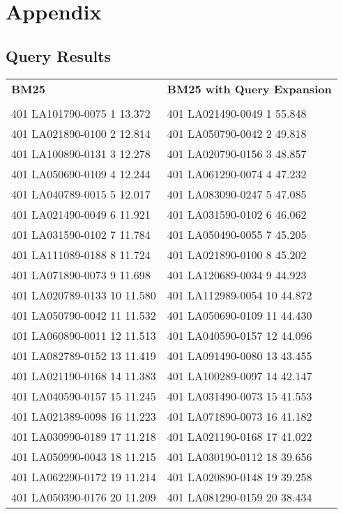 
\appendix
\section{Appendix}
\setlength{\tabcolsep}{15pt}

\subsection{Query Results}
\label{query_results}

\begin{tabular}{ l l }
\textbf{BM25} & \textbf{BM25 with Query Expansion}\\
\\
401 LA101790-0075 1 13.372 & 401 LA021490-0049 1 55.848\\
401 LA021890-0100 2 12.814 & 401 LA050790-0042 2 49.818\\
401 LA100890-0131 3 12.278 & 401 LA020790-0156 3 48.857\\
401 LA050690-0109 4 12.244 & 401 LA061290-0074 4 47.232\\
401 LA040789-0015 5 12.017 & 401 LA083090-0247 5 47.085\\
401 LA021490-0049 6 11.921 & 401 LA031590-0102 6 46.062\\
401 LA031590-0102 7 11.784 & 401 LA050490-0055 7 45.205\\
401 LA111089-0188 8 11.724 & 401 LA021890-0100 8 45.202\\
401 LA071890-0073 9 11.698 & 401 LA120689-0034 9 44.923\\
401 LA020789-0133 10 11.580 & 401 LA112989-0054 10 44.872\\
401 LA050790-0042 11 11.532 & 401 LA050690-0109 11 44.430\\
401 LA060890-0011 12 11.513 & 401 LA040590-0157 12 44.096\\
401 LA082789-0152 13 11.419 & 401 LA091490-0080 13 43.455\\
401 LA021190-0168 14 11.383 & 401 LA100289-0097 14 42.147\\
401 LA040590-0157 15 11.245 & 401 LA031490-0073 15 41.553\\
401 LA021389-0098 16 11.223 & 401 LA071890-0073 16 41.182\\
401 LA030990-0189 17 11.218 & 401 LA021190-0168 17 41.022\\
401 LA050990-0043 18 11.215 & 401 LA030190-0112 18 39.656\\
401 LA062290-0172 19 11.214 & 401 LA020890-0148 19 39.258\\
401 LA050390-0176 20 11.209 & 401 LA081290-0159 20 38.434\\

\end{tabular}
